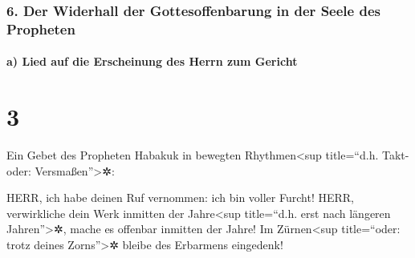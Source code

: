 \hypertarget{der-widerhall-der-gottesoffenbarung-in-der-seele-des-propheten}{%
\subsubsection{6. Der Widerhall der Gottesoffenbarung in der Seele des
Propheten}\label{der-widerhall-der-gottesoffenbarung-in-der-seele-des-propheten}}

\hypertarget{a-lied-auf-die-erscheinung-des-herrn-zum-gericht}{%
\paragraph{a) Lied auf die Erscheinung des Herrn zum
Gericht}\label{a-lied-auf-die-erscheinung-des-herrn-zum-gericht}}

\hypertarget{section-2}{%
\section{3}\label{section-2}}

 Ein Gebet des Propheten Habakuk in bewegten
Rhythmen\textless sup title=``d.h. Takt- oder: Versmaßen''\textgreater✲:

 HERR, ich habe deinen Ruf vernommen: ich bin voller
Furcht! HERR, verwirkliche dein Werk inmitten der Jahre\textless sup
title=``d.h. erst nach längeren Jahren''\textgreater✲, mache es offenbar
inmitten der Jahre! Im Zürnen\textless sup title=``oder: trotz deines
Zorns''\textgreater✲ bleibe des Erbarmens eingedenk!

